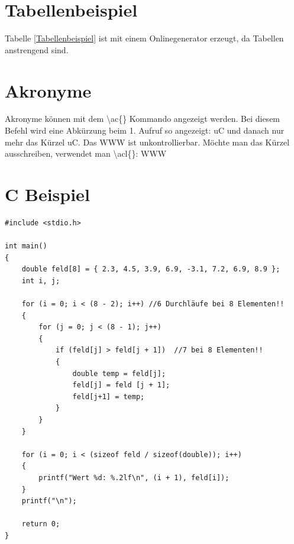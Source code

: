 \section{Tabellenbeispiel}
\label{sec:tabelle}

Tabelle \ref{Tabellenbeispiel} ist mit einem Onlinegenerator erzeugt, da Tabellen anstrengend sind.

\begin{table}[H]
\caption{Tabellenbeispiel}
\label{Tabellenbeispiel}
\end{table}

\section{Akronyme}
\label{sec:akronyme}
Akronyme können mit dem \textbackslash{}ac\{\} Kommando angezeigt werden. Bei diesem Befehl wird eine Abkürzung beim 1. Aufruf so angezeigt: \ac{uC} und danach nur mehr das Kürzel \ac{uC}. Das \ac{WWW} ist unkontrollierbar. Möchte man das Kürzel ausschreiben, verwendet man \textbackslash{}acl\{\}: \acl{WWW}

\section{C Beispiel}
\label{sec:c-beispiel}

\begin{lstlisting}[style=C,caption=C Codebeispiel]
#include <stdio.h>

int main()
{
    double feld[8] = { 2.3, 4.5, 3.9, 6.9, -3.1, 7.2, 6.9, 8.9 };
    int i, j;
    
    for (i = 0; i < (8 - 2); i++) //6 Durchläufe bei 8 Elementen!!
    {  
        for (j = 0; j < (8 - 1); j++)
        {
            if (feld[j] > feld[j + 1])  //7 bei 8 Elementen!!
            {
                double temp = feld[j];
                feld[j] = feld [j + 1];
                feld[j+1] = temp;
            }
        }
    }
    
    for (i = 0; i < (sizeof feld / sizeof(double)); i++)
    {
        printf("Wert %d: %.2lf\n", (i + 1), feld[i]);
    }
    printf("\n");
    
    return 0;
}

\end{lstlisting}
\newpage